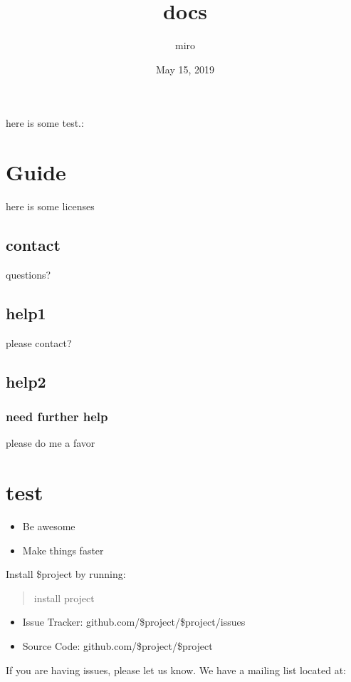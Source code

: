 \documentclass[letterpaper,10pt,english]{sphinxmanual}
\title{docs}
\date{May 15, 2019}
\author{miro}
\begin{document}
\pagestyle{empty}
\sphinxmaketitle
\pagestyle{plain}
\sphinxtableofcontents
\pagestyle{normal}
\label{\detokenize{index::doc}}


here is some test.:

\begin{sphinxVerbatim}[commandchars=\\\{\}]
 
 
\end{sphinxVerbatim}


\chapter{Guide}
\label{\detokenize{index:guide}}
here is some licenses


\section{contact}
\label{\detokenize{License:contact}}\label{\detokenize{License::doc}}
questions?


\section{help1}
\label{\detokenize{help:help1}}\label{\detokenize{help::doc}}
please contact?


\section{help2}
\label{\detokenize{help:help2}}

\subsection{need further help}
\label{\detokenize{help:need-further-help}}
please do me a favor


\chapter{test}
\label{\detokenize{index:test}}\begin{itemize}
\item {} 
Be awesome

\item {} 
Make things faster

\end{itemize}

Install \$project by running:
\begin{quote}

install project
\end{quote}
\begin{itemize}
\item {} 
Issue Tracker: github.com/\$project/\$project/issues

\item {} 
Source Code: github.com/\$project/\$project

\end{itemize}

If you are having issues, please let us know.
We have a mailing list located at: 



\renewcommand{\indexname}{Index}
\printindex
\end{document}
